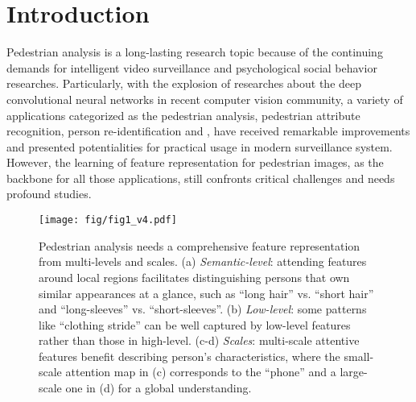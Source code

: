 \documentclass[10pt,twocolumn,letterpaper]{article}
\begin{document}
\section{Introduction}
\label{sec:intro}
Pedestrian analysis is a long-lasting research topic because of the continuing demands for intelligent video surveillance and psychological social behavior researches.
Particularly, with the explosion of researches about the deep convolutional neural networks in recent computer vision community, a variety of applications categorized as the pedestrian analysis, \eg pedestrian attribute recognition, person re-identification and \etc, have received remarkable improvements and presented potentialities for practical usage in modern surveillance system.
However, the learning of feature representation for pedestrian images, as the backbone for all those applications, still confronts critical challenges and needs profound studies.



\begin{figure}[t]
\centering
\texttt{[image: fig/fig1\_v4.pdf]}
\caption{
Pedestrian analysis needs a comprehensive feature representation from multi-levels and scales.
(a) \textit{Semantic-level}: attending features around local regions facilitates distinguishing persons that own similar appearances at a glance, such as ``long hair'' vs. ``short hair'' and ``long-sleeves'' vs. ``short-sleeves''.
(b) \textit{Low-level}: some patterns like ``clothing stride'' can be well captured by low-level features rather than those in high-level.
(c-d) \textit{Scales}: multi-scale attentive features benefit describing person's characteristics, where the small-scale attention map in (c) corresponds to the ``phone'' and a large-scale one in (d) for a global understanding.
}
\label{fig:fig1}
\vspace{-5pt}
\end{figure}
\end{document}
